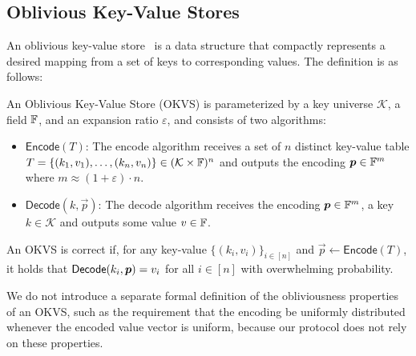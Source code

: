 \subsection{Oblivious Key-Value Stores}\label{sec:RB-OKVS}
An oblivious key-value store~\cite{GPR+21} is a data structure that compactly represents a desired mapping from a set of keys to corresponding values. The definition is as follows:

\begin{definition}
An Oblivious Key-Value Store (OKVS) is parameterized by a key universe $\mathcal{K}$, a field $\F$, and an expansion ratio $\varepsilon$, and consists of two algorithms:
\begin{itemize}
    \item $\mathsf{Encode}(T)$:  
    The encode algorithm receives a set of $n$ distinct key-value table 
    $T = \{ (k_1, v_1), \dots, (k_n, v_n) \} \in (\mathcal{K} \times \F)^n$  
    and outputs the encoding $\vec p \in \F^m$ where $m \approx (1 + \varepsilon)\cdot n$.    
    \item $\mathsf{Decode}(k, \vec p)$:  
    The decode algorithm receives the encoding $\vec p \in \F^m$,  
    a key $k \in \mathcal{K}$ and outputs some value $v \in \F$.    
\end{itemize}
\end{definition}

An OKVS is correct if, for any key-value $\{(k_i, v_i)\}_{i\in [n]}$ and $\vec p \leftarrow \mathsf{Encode}(T)$, it holds that ${\sf Decode}(k_i, \vec p) = v_i$ for all $i\in [n]$ with overwhelming probability.

We do not introduce a separate formal definition of the obliviousness properties of an OKVS, such as the requirement
that the encoding be uniformly distributed whenever the encoded value vector is uniform, because our protocol does
not rely on these properties.

